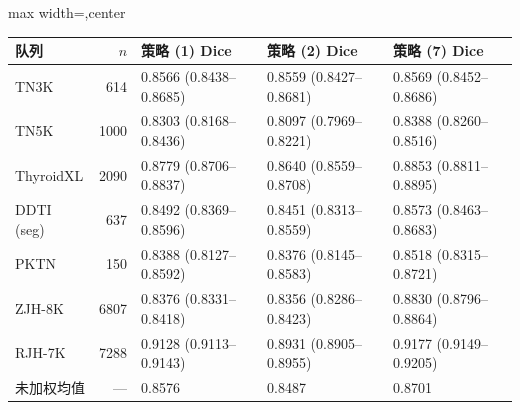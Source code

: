 
\begin{responsetable}
\caption{}
\begin{adjustbox}{max width=\textwidth,center}
\begin{tabular}{@{}l r l l l@{}}
\toprule
队列 & $n$ & 策略 (1) Dice & 策略 (2) Dice & 策略 (7) Dice \\
\midrule
TN3K & 614 & 0.8566 (0.8438--0.8685) & 0.8559 (0.8427--0.8681) & 0.8569 (0.8452--0.8686) \\
TN5K & 1000 & 0.8303 (0.8168--0.8436) & 0.8097 (0.7969--0.8221) & 0.8388 (0.8260--0.8516) \\
ThyroidXL & 2090 & 0.8779 (0.8706--0.8837) & 0.8640 (0.8559--0.8708) & 0.8853 (0.8811--0.8895) \\
DDTI (seg) & 637 & 0.8492 (0.8369--0.8596) & 0.8451 (0.8313--0.8559) & 0.8573 (0.8463--0.8683) \\
PKTN & 150 & 0.8388 (0.8127--0.8592) & 0.8376 (0.8145--0.8583) & 0.8518 (0.8315--0.8721) \\
ZJH-8K & 6807 & 0.8376 (0.8331--0.8418) & 0.8356 (0.8286--0.8423) & 0.8830 (0.8796--0.8864) \\
RJH-7K & 7288 & 0.9128 (0.9113--0.9143) & 0.8931 (0.8905--0.8955) & 0.9177 (0.9149--0.9205) \\
\midrule
未加权均值 & --- & 0.8576 & 0.8487 & 0.8701 \\
\bottomrule
\end{tabular}
\end{adjustbox}
\end{responsetable}


